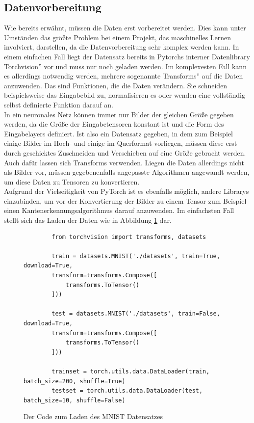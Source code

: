 \documentclass[11pt]{article}
\begin{document}
\subsection{Datenvorbereitung}
Wie bereits erwähnt, müssen die Daten erst vorbereitet werden. Dies kann unter Umständen das größte Problem bei einem Projekt, das maschinelles Lernen involviert, darstellen, da die Datenvorbereitung sehr komplex werden kann. In einem einfachen Fall liegt der Datensatz bereits in Pytorchs interner Datenlibrary \glqq Torchvision'' vor und muss nur noch geladen werden. Im komplexesten Fall kann es allerdings notwendig werden, mehrere sogenannte \glqq Transforms'' auf die Daten anzuwenden. Das sind Funktionen, die die Daten verändern. Sie schneiden beispielsweise das Eingabebild zu, normalisieren es oder wenden eine vollständig selbst definierte Funktion darauf an.\\
In ein neuronales Netz können immer nur Bilder der gleichen Größe gegeben werden, da die Größe der Eingabetensoren konstant ist und die Form des Eingabelayers definiert. Ist also ein Datensatz gegeben, in dem zum Beispiel  einige Bilder im Hoch- und einige im Querformat vorliegen, müssen diese erst durch geschicktes Zuschneiden und Verschieben auf eine Größe gebracht werden. Auch dafür lassen sich Transforms verwenden. Liegen die Daten allerdings nicht als Bilder vor, müssen gegebenenfalls angepasste Algorithmen angewandt werden, um diese Daten zu Tensoren zu konvertieren.\\
Aufgrund der Vielseitigkeit von PyTorch ist es ebenfalls möglich, andere Librarys einzubinden, um vor der Konvertierung der Bilder zu einem Tensor zum Beispiel einen Kantenerkennungsalgorithmus darauf anzuwenden. Im einfachsten Fall stellt sich das Laden der Daten wie in Abbildung \ref{MNIST_Dataloader_Code} dar.
\begin{figure}[h]
	\begin{verbatim}
		from torchvision import transforms, datasets
	
		train = datasets.MNIST('./datasets', train=True, download=True,
		transform=transforms.Compose([
			transforms.ToTensor()
		]))
		
		test = datasets.MNIST('./datasets', train=False, download=True,
		transform=transforms.Compose([
			transforms.ToTensor()
		]))
		
		trainset = torch.utils.data.DataLoader(train, batch_size=200, shuffle=True)
		testset = torch.utils.data.DataLoader(test, batch_size=10, shuffle=False)
	\end{verbatim}
	\caption{Der Code zum Laden des MNIST Datensatzes}
	\label{MNIST_Dataloader_Code}
\end{figure}
\end{document}
